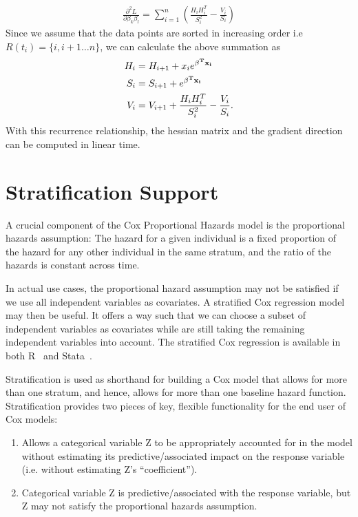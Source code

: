 \begin{align}
\frac{\partial^2 L}{\partial \beta_k \beta_l} = \sum_{i = 1}^n \left( \frac{H_{i}H_{i}^T }{ S_{i}^2 } -  \frac{V_{i}}{ S_{i} } \right)
\end{align}
Since we assume that the data points are sorted in increasing order i.e
$R(t_i) = \{i, i+1 \ldots n \}$, we can calculate the above summation as
\begin{align}
H_{i}& =   H_{i+1} +  x_{i} e^{\bold{\beta^T x_i}} \label{eq:numerator_avg}\\
S_i & = S_{i+1} + e^{\bold{\beta^T x_i}} \label{eq:denominator_avg}\\
V_i & = V_{i+1} +  \frac{H_{i}H_{i}^T }{ S_{i}^2 } -  \frac{V_{i}}{
  S_{i}} \label{eq:hessian}.
\end{align}
With this recurrence relationship, the hessian matrix and the gradient direction
can be computed in linear time.



\section{Stratification Support}\label{cox:stratified}
A crucial component of the Cox Proportional Hazards model is the proportional hazards assumption:
The hazard for a given individual is a fixed proportion of the hazard for any
other individual in the same stratum, and the ratio of the hazards is constant
across time.

In actual use cases, the proportional hazard assumption may not be satisfied if
we use all independent variables as covariates. A stratified Cox regression
model may then be useful. It offers a way such that we can choose a subset of
independent variables as covariates while are still taking the remaining
independent variables into account. The stratified Cox regression is available
in both R~\cite{r-cox} and Stata~\cite{stata-cox}.

Stratification is used as shorthand for building a Cox model that allows for
more than one stratum, and hence, allows for more than one baseline hazard
function.  Stratification provides two pieces of key, flexible functionality for
the end user of Cox models:
\begin{enumerate}
    \item Allows a categorical variable Z to be appropriately accounted for in
    the model without estimating its predictive/associated impact on the
    response variable (i.e. without estimating Z's ``coefficient'').
    \item Categorical variable Z is predictive/associated with the response
    variable, but Z may not satisfy the proportional hazards assumption.
\end{enumerate}

